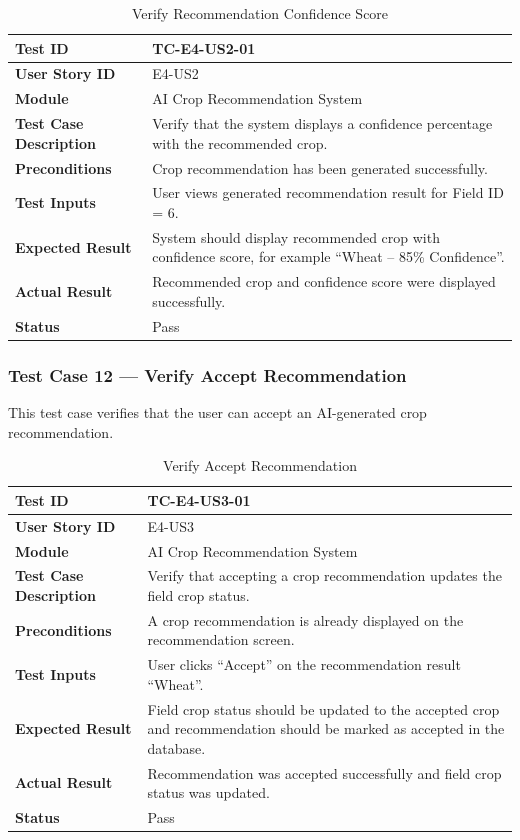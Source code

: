 \begin{longtable}{|p{4cm}|p{8cm}|}
\caption{Verify Recommendation Confidence Score}
\label{tab:tc_confidence_score} \\
\hline
\textbf{Test ID} & TC-E4-US2-01 \\ \hline
\textbf{User Story ID} & E4-US2 \\ \hline
\textbf{Module} & AI Crop Recommendation System \\ \hline
\textbf{Test Case Description} & Verify that the system displays a 
confidence percentage with the recommended crop. \\ \hline
\textbf{Preconditions} & Crop recommendation has been generated 
successfully. \\ \hline
\textbf{Test Inputs} & User views generated recommendation result 
for Field ID = 6. \\ \hline
\textbf{Expected Result} & System should display recommended crop 
with confidence score, for example ``Wheat -- 85\% Confidence''. \\ 
\hline
\textbf{Actual Result} & Recommended crop and confidence score were 
displayed successfully. \\ \hline
\textbf{Status} & Pass \\ \hline
\end{longtable}

\subsubsection{Test Case 12 --- Verify Accept Recommendation}

This test case verifies that the user can accept an AI-generated 
crop recommendation.

\begin{longtable}{|p{4cm}|p{8cm}|}
\caption{Verify Accept Recommendation}
\label{tab:tc_accept_recommendation} \\
\hline
\textbf{Test ID} & TC-E4-US3-01 \\ \hline
\textbf{User Story ID} & E4-US3 \\ \hline
\textbf{Module} & AI Crop Recommendation System \\ \hline
\textbf{Test Case Description} & Verify that accepting a crop 
recommendation updates the field crop status. \\ \hline
\textbf{Preconditions} & A crop recommendation is already displayed 
on the recommendation screen. \\ \hline
\textbf{Test Inputs} & User clicks ``Accept'' on the recommendation 
result ``Wheat''. \\ \hline
\textbf{Expected Result} & Field crop status should be updated to 
the accepted crop and recommendation should be marked as accepted in 
the database. \\ \hline
\textbf{Actual Result} & Recommendation was accepted successfully 
and field crop status was updated. \\ \hline
\textbf{Status} & Pass \\ \hline
\end{longtable}


